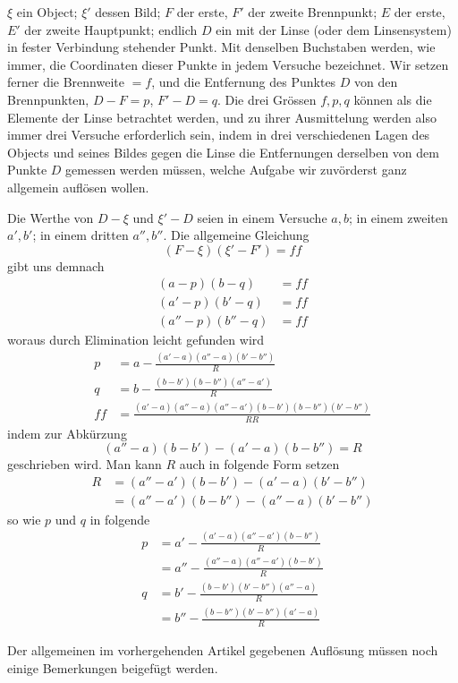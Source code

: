 $\xi$ ein Object; $\xi'$ dessen Bild; $F$ der erste, $F'$ der zweite Brennpunkt; $E$ der erste, $E'$ der zweite Hauptpunkt; endlich $D$ ein mit der Linse (oder dem Linsensystem) in fester Verbindung stehender Punkt. Mit denselben Buchstaben werden, wie immer, die Coordinaten dieser Punkte in jedem Versuche bezeichnet. Wir setzen ferner die Brennweite $=f$, und die Entfernung des Punktes $D$ von den Brennpunkten, $D-F=p$, $F'-D=q$. Die drei Grössen $f,p,q$ können als die Elemente der Linse betrachtet werden, und zu ihrer Ausmittelung werden also immer drei Versuche erforderlich sein, indem in drei verschiedenen Lagen des Objects und seines Bildes gegen die Linse die Entfernungen derselben von dem Punkte $D$ gemessen werden müssen, welche Aufgabe wir zuvörderst ganz allgemein auflösen wollen.

Die Werthe von $D-\xi$ und $\xi'-D$ seien in einem Versuche $a,b$; in einem zweiten $a',b'$; in einem dritten $a'',b''$. Die allgemeine Gleichung
\[
(F-\xi)(\xi'-F')=ff
\]
gibt uns demnach
\[
\begin{aligned}
(a-p)(b-q)&=ff\\
(a'-p)(b'-q)&=ff\\
(a''-p)(b''-q)&=ff
\end{aligned}
\]
woraus durch Elimination leicht gefunden wird
\[
\begin{aligned}
p&=a-\frac{(a'-a)(a''-a)(b'-b'')}{R}\\
q&=b-\frac{(b-b')(b-b'')(a''-a')}{R}\\
ff&=\frac{(a'-a)(a''-a)(a''-a')(b-b')(b-b'')(b'-b'')}{RR}
\end{aligned}
\]
indem zur Abkürzung
\[
(a''-a)(b-b')-(a'-a)(b-b'')=R
\]
geschrieben wird. Man kann $R$ auch in folgende Form setzen
\[
\begin{aligned}
R&=(a''-a')(b-b')-(a'-a)(b'-b'')\\
&=(a''-a')(b-b'')-(a''-a)(b'-b'')
\end{aligned}
\]
so wie $p$ und $q$ in folgende
\[
\begin{aligned}
p&=a'-\frac{(a'-a)(a''-a')(b-b'')}{R}\\
&=a''-\frac{(a''-a)(a''-a')(b-b')}{R}\\
q&=b'-\frac{(b-b')(b'-b'')(a''-a)}{R}\\
&=b''-\frac{(b-b'')(b'-b'')(a'-a)}{R}
\end{aligned}
\]

Der allgemeinen im vorhergehenden Artikel gegebenen Auflösung müssen noch einige Bemerkungen beigefügt werden.

